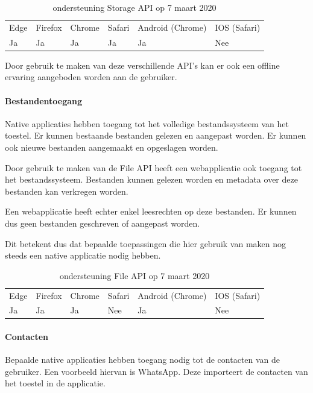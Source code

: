 	\begin{table}[H]
		\centering
		\begin{tabular}{llllll}
			Edge & Firefox & Chrome & Safari & Android (Chrome) & IOS (Safari) \\
			Ja   & Ja      &  Ja     & Ja     & Ja               & Nee          
		\end{tabular}	
		\caption{ondersteuning Storage API op 7 maart 2020}
	\end{table}
	
	
	
Door gebruik te maken van deze verschillende API’s kan er ook een offline ervaring aangeboden worden aan de gebruiker. 
	
\paragraph{Bestandentoegang}

Native applicaties hebben toegang tot het volledige bestandssysteem van het toestel. Er kunnen bestaande bestanden gelezen en aangepast worden. Er kunnen ook nieuwe bestanden aangemaakt en opgeslagen worden.

Door gebruik te maken van de File API \autocite{Kruisselbrink2019} heeft een webapplicatie ook toegang tot het bestandssysteem. Bestanden kunnen gelezen worden en metadata over deze bestanden kan verkregen worden.

Een webapplicatie heeft echter enkel leesrechten op deze bestanden. Er kunnen dus geen bestanden geschreven of aangepast worden.

Dit betekent dus dat bepaalde toepassingen die hier gebruik van maken nog steeds een native applicatie nodig hebben.

\begin{table}[H]
	\centering
	\begin{tabular}{llllll}
		Edge & Firefox & Chrome & Safari & Android (Chrome) & IOS (Safari) \\
		Ja   & Ja      &  Ja     & Nee     & Ja               & Nee          
	\end{tabular}	
	\caption{ondersteuning File API op 7 maart 2020}
\end{table}	


\paragraph{Contacten}
Bepaalde native applicaties hebben toegang nodig tot de contacten van de gebruiker. Een voorbeeld hiervan is WhatsApp. Deze importeert de contacten van het toestel in de applicatie.

